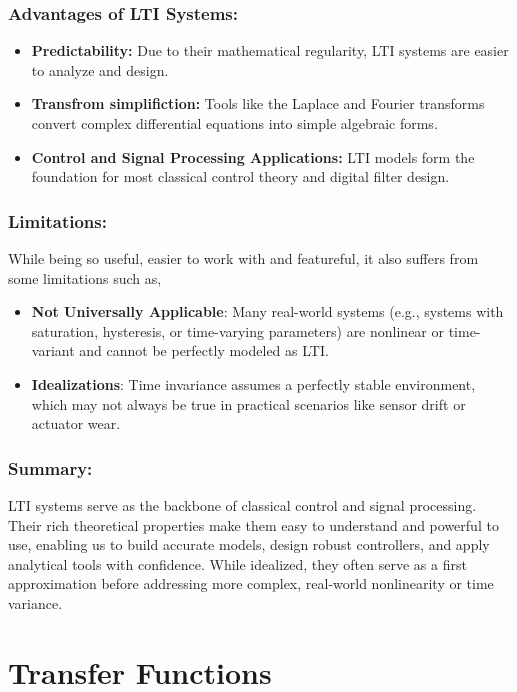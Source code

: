 \documentclass{report}
\begin{document}
\subsection{Advantages of LTI Systems:}
\begin{itemize}
    \item \textbf{Predictability:} Due to their mathematical regularity, LTI systems are easier to analyze and design.
    \item \textbf{Transfrom simplifiction:} Tools like the Laplace and Fourier transforms convert complex differential equations into simple algebraic forms.
    \item \textbf{Control and Signal Processing Applications:} LTI models form the foundation for most classical control theory and digital filter design.
\end{itemize}

\subsection{Limitations:}
While being so useful, easier to work with and featureful, it also suffers from some limitations such as,
\begin{itemize}
    \item \textbf{Not Universally Applicable}: Many real-world systems (e.g., systems with saturation, hysteresis, or time-varying parameters) are nonlinear or time-variant and cannot be perfectly modeled as LTI.
    \item \textbf{Idealizations}: Time invariance assumes a perfectly stable environment, which may not always be true in practical scenarios like sensor drift or actuator wear.
\end{itemize}

\subsection{Summary:}
LTI systems serve as the backbone of classical control and signal processing. Their rich theoretical properties make them easy to understand and powerful to use, enabling us to build accurate models,
design robust controllers, and apply analytical tools with confidence. While idealized, they often serve as a first approximation before addressing more complex, real-world nonlinearity or time variance.

\chapter{Transfer Functions}
\end{document}
